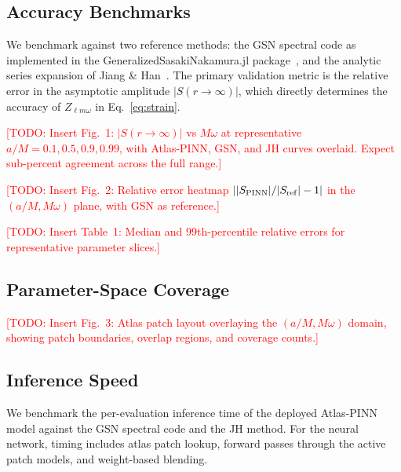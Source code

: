 \documentclass[aps,prd,twocolumn,superscriptaddress,nofootinbib]{revtex4-2}
\newcommand{\TODO}[1]{\textcolor{red}{[TODO: #1]}}
\begin{document}
\subsection{Accuracy Benchmarks}
\label{sec:results_accuracy}

We benchmark against two reference methods: the GSN spectral code as
implemented in the GeneralizedSasakiNakamura.jl package~\cite{Rico:2023gwl},
and the analytic series expansion of Jiang \& Han~\cite{Jiang:2025jh}.  The
primary validation metric is the relative error in the asymptotic amplitude
$|S(r \to \infty)|$, which directly determines the accuracy of
$Z_{\ell m \omega}$ in Eq.~\eqref{eq:strain}.

\TODO{Insert Fig.~1: $|S(r\to\infty)|$ vs $M\omega$ at representative
$a/M = 0.1, 0.5, 0.9, 0.99$, with Atlas-PINN, GSN, and JH curves overlaid.
Expect sub-percent agreement across the full range.}

\TODO{Insert Fig.~2: Relative error heatmap
$||S_{\rm PINN}|/|S_{\rm ref}| - 1|$ in the $(a/M, M\omega)$ plane,
with GSN as reference.}

\TODO{Insert Table~1: Median and 99th-percentile relative errors for
representative parameter slices.}

\subsection{Parameter-Space Coverage}
\label{sec:results_coverage}

\TODO{Insert Fig.~3: Atlas patch layout overlaying the $(a/M, M\omega)$
domain, showing patch boundaries, overlap regions, and coverage counts.}

\subsection{Inference Speed}
\label{sec:results_speed}

We benchmark the per-evaluation inference time of the deployed Atlas-PINN model
against the GSN spectral code and the JH method.  For the neural network,
timing includes atlas patch lookup, forward passes through the active patch
models, and weight-based blending.
\end{document}
